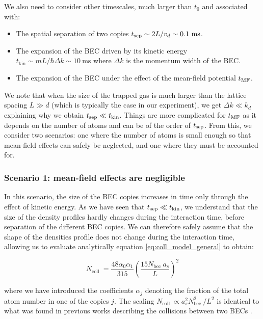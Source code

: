 We also need to consider other timescales, much larger than $t_0$ and associated with:

\begin{itemize}
    \item The spatial separation of two copies $t_{\rm{sep}} \sim 2L/v_d \sim 0.1 \ \rm{ms}$.
    \item The expansion of the BEC driven by its kinetic energy $t_{\mathrm{kin}} \sim m L / \hbar \Delta k \sim 10 \mathrm{~ms}$ where $\Delta k$ is the momentum width of the BEC.
    \item The expansion of the BEC under the effect of the mean-field potential $t_{\rm{MF}}$.
\end{itemize}

\noindent We note that when the size of the trapped gas is much larger than the lattice spacing $L \gg d$ (which is typically the case in our experiment), we get $\Delta k \ll k_d$ explaining why we obtain $t_{\rm{sep}} \ll t_{\rm{kin}}$. Things are more complicated for $t_{\rm{MF}}$ as it depends on the number of atoms and can be of the order of $t_{\rm{sep}}$. From this, we consider two scenarios: one where the number of atoms is small enough so that mean-field effects can safely be neglected, and one where they must be accounted for.

\subsubsection{Scenario 1: mean-field effects are negligible}

In this scenario, the size of the BEC copies increases in time only through the effect of kinetic energy. As we have seen that $t_{\rm{sep}} \ll t_{\rm{kin}}$, we understand that the size of the density profiles hardly changes during the interaction time, \ie before separation of the different BEC copies. We can therefore safely assume that the shape of the densities profile does not change during the interaction time, allowing us to evaluate analytically equation \ref{eq:coll_model_general} to obtain:

\begin{equation}
    N_{\text {coll }}=\frac{48 \alpha_{0} \alpha_{1}}{315}\left(\frac{15 N_{\text {bec }} a_{s}}{L}\right)^{2}
    \label{eq:analytical_model}
\end{equation}

\noindent where we have introduced the coefficients $\alpha_j$ denoting the fraction of the total atom number in one of the copies $j$. The scaling $N_{\text {coll }} \propto a_{s}^{2} N_{\text {bec }}^{2} / L^{2}$ is identical to what was found in previous works describing the collisions between two BECs \cite{zin2005quantum,zin2006elastic}. 

